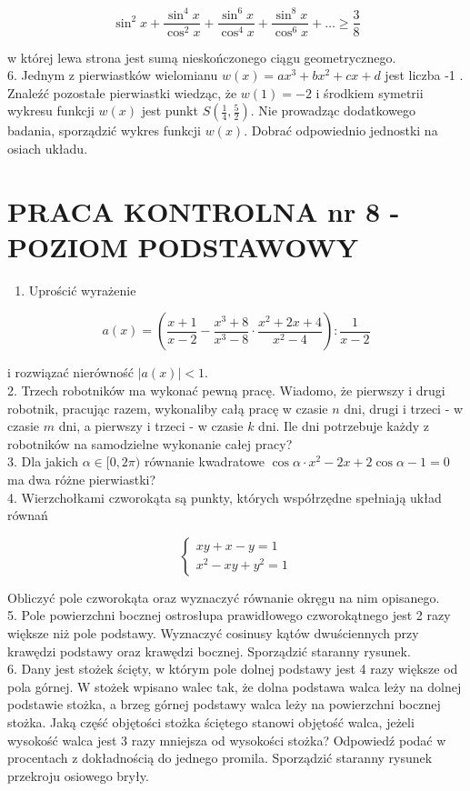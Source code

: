 \documentclass[10pt]{article}
\begin{document}
$$
\sin ^{2} x+\frac{\sin ^{4} x}{\cos ^{2} x}+\frac{\sin ^{6} x}{\cos ^{4} x}+\frac{\sin ^{8} x}{\cos ^{6} x}+\ldots \geqslant \frac{3}{8}
$$

w której lewa strona jest sumą nieskończonego ciągu geometrycznego.\\
6. Jednym z pierwiastków wielomianu $w(x)=a x^{3}+b x^{2}+c x+d$ jest liczba -1 . Znaleźć pozostałe pierwiastki wiedząc, że $w(1)=-2$ i środkiem symetrii wykresu funkcji $w(x)$ jest punkt $S\left(\frac{1}{4}, \frac{5}{2}\right)$. Nie prowadząc dodatkowego badania, sporządzić wykres funkcji $w(x)$. Dobrać odpowiednio jednostki na osiach układu.

\section*{PRACA KONTROLNA nr 8 - POZIOM PODSTAWOWY}
\begin{enumerate}
  \item Uprościć wyrażenie
\end{enumerate}

$$
a(x)=\left(\frac{x+1}{x-2}-\frac{x^{3}+8}{x^{3}-8} \cdot \frac{x^{2}+2 x+4}{x^{2}-4}\right): \frac{1}{x-2}
$$

i rozwiązać nierówność $|a(x)|<1$.\\
2. Trzech robotników ma wykonać pewną pracę. Wiadomo, że pierwszy i drugi robotnik, pracując razem, wykonaliby całą pracę w czasie $n$ dni, drugi i trzeci - w czasie $m$ dni, a pierwszy i trzeci - w czasie $k$ dni. Ile dni potrzebuje każdy z robotników na samodzielne wykonanie całej pracy?\\
3. Dla jakich $\alpha \in[0,2 \pi)$ równanie kwadratowe $\cos \alpha \cdot x^{2}-2 x+2 \cos \alpha-1=0$ ma dwa różne pierwiastki?\\
4. Wierzchołkami czworokąta są punkty, których współrzędne spełniają układ równań

$$
\left\{\begin{array}{l}
x y+x-y=1 \\
x^{2}-x y+y^{2}=1
\end{array}\right.
$$

Obliczyć pole czworokąta oraz wyznaczyć równanie okręgu na nim opisanego.\\
5. Pole powierzchni bocznej ostrosłupa prawidłowego czworokątnego jest 2 razy większe niż pole podstawy. Wyznaczyć cosinusy kątów dwuściennych przy krawędzi podstawy oraz krawędzi bocznej. Sporządzić staranny rysunek.\\
6. Dany jest stożek ścięty, w którym pole dolnej podstawy jest 4 razy większe od pola górnej. W stożek wpisano walec tak, że dolna podstawa walca leży na dolnej podstawie stożka, a brzeg górnej podstawy walca leży na powierzchni bocznej stożka. Jaką część objętości stożka ściętego stanowi objętość walca, jeżeli wysokość walca jest 3 razy mniejsza od wysokości stożka? Odpowiedź podać w procentach z dokładnością do jednego promila. Sporządzić staranny rysunek przekroju osiowego bryły.
\end{document}
